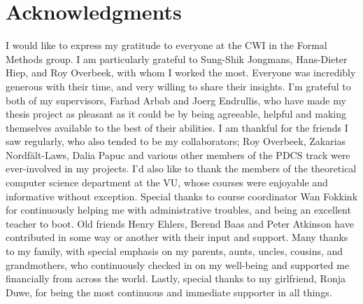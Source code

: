 \documentclass[11pt]{report}
\begin{document}

\chapter*{Acknowledgments}
I would like to express my gratitude to everyone at the CWI in the Formal Methods group. I am particularly grateful to Sung-Shik Jongmans, Hans-Dieter Hiep, and Roy Overbeek, with whom I worked the most. Everyone was incredibly generous with their time, and very willing to share their insights. I'm grateful to both of my supervisors, Farhad Arbab and Joerg Endrullis, who have made my thesis project as pleasant as it could be by being agreeable, helpful and making themselves available to the best of their abilities. I am thankful for the friends I saw regularly, who also tended to be my collaborators; Roy Overbeek, Zakarias Nordf\"alt-Laws, Dalia Papuc and various other members of the PDCS track were ever-involved in my projects. I'd also like to thank the members of the theoretical computer science department at the VU, whose courses were enjoyable and informative without exception. Special thanks to course coordinator Wan Fokkink for continuously helping me with administrative troubles, and being an excellent teacher to boot. Old friends Henry Ehlers, Berend Baas and Peter Atkinson have contributed in some way or another with their input and support. Many thanks to my family, with special emphasis on my parents, aunts, uncles, cousins, and grandmothers, who continuously checked in on my well-being and supported me financially from across the world. Lastly, special thanks to my girlfriend, Ronja Duwe, for being the most continuous and immediate supporter in all things.



\tableofcontents
\listoffigures

\newpage














\begin{appendices}

\end{appendices}
\end{document}
